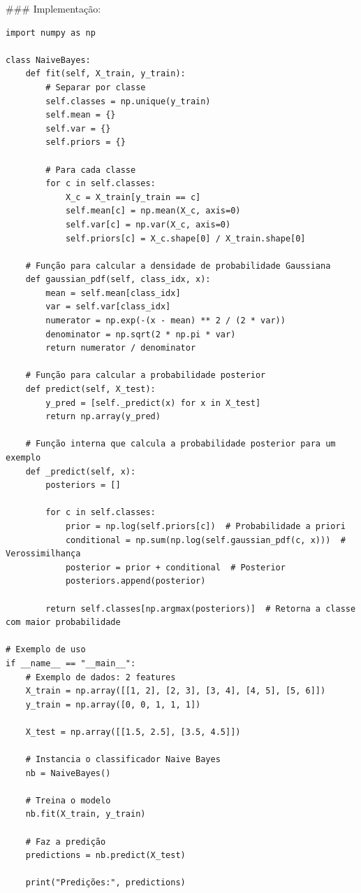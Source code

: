 \documentclass[12pt]{article}
\begin{document}
### Implementação:

\begin{verbatim}
import numpy as np

class NaiveBayes:
    def fit(self, X_train, y_train):
        # Separar por classe
        self.classes = np.unique(y_train)
        self.mean = {}
        self.var = {}
        self.priors = {}
        
        # Para cada classe
        for c in self.classes:
            X_c = X_train[y_train == c]
            self.mean[c] = np.mean(X_c, axis=0)
            self.var[c] = np.var(X_c, axis=0)
            self.priors[c] = X_c.shape[0] / X_train.shape[0]

    # Função para calcular a densidade de probabilidade Gaussiana
    def gaussian_pdf(self, class_idx, x):
        mean = self.mean[class_idx]
        var = self.var[class_idx]
        numerator = np.exp(-(x - mean) ** 2 / (2 * var))
        denominator = np.sqrt(2 * np.pi * var)
        return numerator / denominator
    
    # Função para calcular a probabilidade posterior
    def predict(self, X_test):
        y_pred = [self._predict(x) for x in X_test]
        return np.array(y_pred)
    
    # Função interna que calcula a probabilidade posterior para um exemplo
    def _predict(self, x):
        posteriors = []
        
        for c in self.classes:
            prior = np.log(self.priors[c])  # Probabilidade a priori
            conditional = np.sum(np.log(self.gaussian_pdf(c, x)))  # Verossimilhança
            posterior = prior + conditional  # Posterior
            posteriors.append(posterior)
        
        return self.classes[np.argmax(posteriors)]  # Retorna a classe com maior probabilidade

# Exemplo de uso
if __name__ == "__main__":
    # Exemplo de dados: 2 features
    X_train = np.array([[1, 2], [2, 3], [3, 4], [4, 5], [5, 6]])
    y_train = np.array([0, 0, 1, 1, 1])

    X_test = np.array([[1.5, 2.5], [3.5, 4.5]])

    # Instancia o classificador Naive Bayes
    nb = NaiveBayes()
    
    # Treina o modelo
    nb.fit(X_train, y_train)
    
    # Faz a predição
    predictions = nb.predict(X_test)
    
    print("Predições:", predictions)
\end{verbatim}
\end{document}
